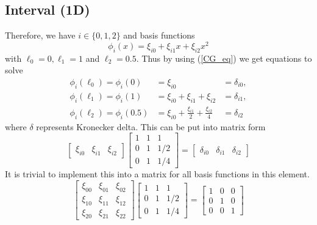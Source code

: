 \documentclass[12pt,a4paper]{article}
\begin{document}
\subsection{Interval (1D)}
Therefore, we have $i \in \{0, 1, 2\}$ and basis functions 
\begin{equation}
\phi_i(x) = \xi_{i0} + \xi_{i1}x + \xi_{i2}x^2
\end{equation}
with $\ell_0 = 0, \ell_1 = 1$ and $\ell_2 = 0.5$. Thus by using (\ref{CG_eq}) we get equations to solve
\begin{align}
\phi_i(\ell_0) = \phi_i(0) &= \xi_{i0} &= \delta_{i0},\\
\phi_i(\ell_1) = \phi_i(1) &= \xi_{i0} + \xi_{i1} + \xi_{i2} &= \delta_{i1},\\
\phi_i(\ell_2) = \phi_i(0.5) &= \xi_{i0} + \frac{\xi_{i1}}{2} + \frac{\xi_{i2}}{4} &= \delta_{i2}
\end{align}
where $\delta$ represents Kronecker delta. This can be put into matrix form
\begin{equation}
\left[ \begin{matrix}
\xi_{i0} & \xi_{i1} & \xi_{i2}
\end{matrix} \right]
\left[ \begin{matrix}
1 & 1 & 1 \\
0 & 1 & 1/2 \\
0 & 1 & 1/4
\end{matrix} \right] = 
\left[ \begin{matrix}
\delta_{i0} & \delta_{i1} & \delta_{i2}
\end{matrix} \right]
\end{equation}
It is trivial to implement this into a matrix for all basis functions in this element.
\begin{equation}
\left[ \begin{matrix}
\xi_{00} & \xi_{01} & \xi_{02} \\
\xi_{10} & \xi_{11} & \xi_{12} \\
\xi_{20} & \xi_{21} & \xi_{22} 
\end{matrix} \right]
\left[ \begin{matrix}
1 & 1 & 1 \\
0 & 1 & 1/2 \\
0 & 1 & 1/4
\end{matrix} \right] = 
\left[ \begin{matrix}
1 & 0 & 0 \\
0 & 1 & 0 \\
0 & 0 & 1
\end{matrix} \right]
\end{equation}
\end{document}
